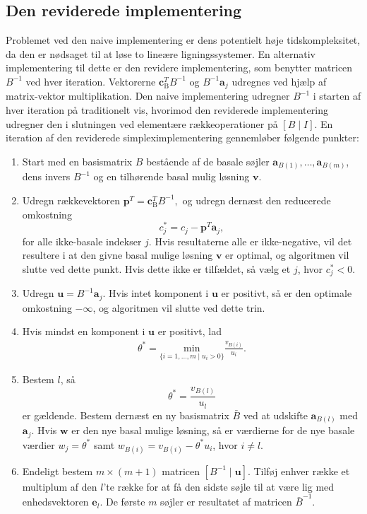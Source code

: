 \subsection{Den reviderede implementering}
Problemet ved den naive implementering er dens potentielt høje tidskompleksitet, da den er nødsaget til at løse to lineære ligningssystemer.
En alternativ implementering til dette er den revidere implementering, som benytter matricen $B^{-1}$ ved hver iteration.
Vektorerne $\mathbf{c}_{\text{B}}^T B^{-1}$ og $B^{-1} \mathbf{a}_j$ udregnes ved hjælp af matrix-vektor multiplikation.
Den naive implementering udregner $B^{-1}$ i starten af hver iteration på traditionelt vis, hvorimod den reviderede implementering udregner den i slutningen ved elementære rækkeoperationer på $[B \mid I]$.
En iteration af den reviderede simpleximplementering gennemløber følgende punkter: 
% 
\begin{tcolorbox}[
title=Den reviderede implementering,
colback		= myblue!15,
colframe	= myblue!15,
coltitle	= black,
before skip	= 20pt plus 2pt,
after skip	= 20pt plus 2pt,
fonttitle	= \bfseries]
\begin{enumerate}
\item Start med en basismatrix $B$ bestående af de basale søjler $\textbf{a}_{B(1)},\ldots,\textbf{a}_{B(m)}$, dens invers $B^{-1}$ og en tilhørende basal mulig løsning $\mathbf{v}$. 
\item Udregn rækkevektoren $\mathbf{p}^T=\mathbf{c}_{\text{B}}^T B^{-1},$ og udregn dernæst den reducerede omkostning $$c_j^* = c_j - \mathbf{p}^T \mathbf{a}_j,$$ for alle ikke-basale indekser $j$.
Hvis resultaterne alle er ikke-negative, vil det resultere i at den givne basal mulige løsning $\textbf{v}$ er optimal, og algoritmen vil slutte ved dette punkt.
Hvis dette ikke er tilfældet, så vælg et $j$, hvor $c_j^* < 0$.
\item Udregn $\mathbf{u}=B^{-1}\mathbf{a}_j$.
Hvis intet komponent i $\mathbf{u}$ er positivt, så er den optimale omkostning $-\infty$, og algoritmen vil slutte ved dette trin. 
%
\item Hvis mindst en komponent i $\mathbf{u}$ er positivt, lad 
\begin{align*}
\theta^*=\underset{\{i=1,\ldots,m \mid u_i>0\}}{\text{min}}\frac{v_{B(i)}}{u_i}.
\end{align*}
\item Bestem $l$, så $$\theta^*=\frac{v_{B(l)}}{u_l}$$ er gældende.
Bestem dernæst en ny basismatrix  $\bar{B}$ ved at udskifte $\mathbf{a}_{B(l)}$ med $\mathbf{a}_j$.
Hvis $\mathbf{w}$ er den nye basal mulige løsning, så er værdierne for de nye basale værdier $w_j=\theta^*$ samt $w_{B(i)}=v_{B(i)}-\theta^*u_i$, hvor $i \neq l$.
\item Endeligt bestem $m \times (m+1)$ matricen $\left [B^{-1} \mid \mathbf{u} \right ]$.
Tilføj enhver række et multiplum af den $l$'te række for at få den sidste søjle til at være lig med enhedsvektoren $\mathbf{e}_l$.
De første $m$ søjler er resultatet af matricen $\bar{B}^{-1}$.
\end{enumerate}
\end{tcolorbox}
\noindent
%
%
